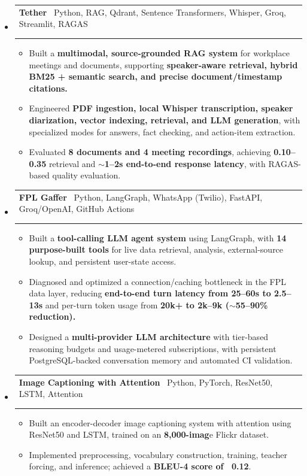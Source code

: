 \documentclass[11pt,a4paper]{article}
\makeatletter
\newcommand{\resumeProjectHeading}[4]{
  \vspace{2pt}
  \item[]
    \begin{tabular*}{\textwidth}[t]{@{\hspace{0pt}}p{0.82\textwidth}@{\extracolsep{\fill}}r}
      \textbf{#1} {\small\textbar\ #2} & \textit{#3} \\
      \if\relax\detokenize{#4}\relax\else
        \multicolumn{2}{l}{\footnotesize\color{gray!70}\faGithub\ \href{#4}{#4}} \\
      \fi
    \end{tabular*}
  \vspace{-12pt}
}
\makeatother
\begin{document}
\begin{itemize}[leftmargin=0pt, label={}]
\resumeProjectHeading
  {Tether}{Python, RAG, Qdrant, Sentence Transformers, Whisper, Groq, Streamlit, RAGAS}{}{https://github.com/DejusDevspace/tether}
  \begin{itemize}[leftmargin=15pt, label=\textbullet]
    \item Built a \textbf{multimodal, source-grounded RAG system} for workplace meetings and documents, supporting \textbf{speaker-aware retrieval, hybrid BM25 + semantic search, and precise document/timestamp citations.}
    \item Engineered \textbf{PDF ingestion, local Whisper transcription, speaker diarization, vector indexing, retrieval, and LLM generation}, with specialized modes for answers, fact checking, and action-item extraction.
    \item Evaluated \textbf{8 documents and 4 meeting recordings}, achieving \textbf{0.10–0.35} retrieval and \textbf{$\sim$1–2s end-to-end response latency}, with RAGAS-based quality evaluation.
  \end{itemize}

\resumeProjectHeading
  {FPL Gaffer}{Python, LangGraph, WhatsApp (Twilio), FastAPI, Groq/OpenAI, GitHub Actions}{}{https://github.com/DejusDevspace/fpl-gaffer}
  \begin{itemize}[leftmargin=15pt, label=\textbullet]
    \item Built a \textbf{tool-calling LLM agent system} using LangGraph, with \textbf{14 purpose-built tools} for live data retrieval, analysis, external-source lookup, and persistent user-state access.
    \item Diagnosed and optimized a connection/caching bottleneck in the FPL data layer, reducing \textbf{end-to-end turn latency from 25–60s to 2.5–13s} and per-turn token usage from \textbf{20k+ to 2k–9k ($\sim$55–90\% reduction).}
    \item Designed a \textbf{multi-provider LLM architecture} with tier-based reasoning budgets and usage-metered subscriptions, with persistent PostgreSQL-backed conversation memory and automated CI validation.
  \end{itemize}

\resumeProjectHeading
    {Image Captioning with Attention}{Python, PyTorch, ResNet50, LSTM, Attention}{}{https://github.com/DejusDevspace/FlexiSAF-Advanced-GenAI-DS-Internship/tree/main/task2/image-captioning}
    \begin{itemize} [leftmargin=15pt, label=\textbullet]
    \item Built an encoder-decoder image captioning system with attention using ResNet50 and LSTM, trained on an \textbf{8,000-imag}e Flickr dataset.
    \item  Implemented preprocessing, vocabulary construction, training, teacher forcing, and inference; achieved a \textbf{BLEU-4 score of ~0.12}.
    \end{itemize}

\end{itemize}
\end{document}
